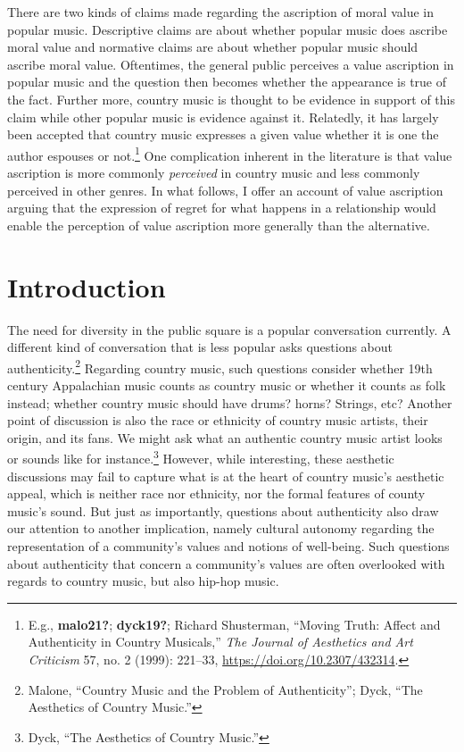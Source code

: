 \documentclass[
  12pt,
]{book}
\theoremstyle{definition}
\theoremstyle{definition}
\theoremstyle{definition}
\theoremstyle{definition}
\theoremstyle{remark}
\begin{document}
There are two kinds of claims made regarding the ascription of moral value in popular music. Descriptive claims are about whether popular music does ascribe moral value and normative claims are about whether popular music should ascribe moral value. Oftentimes, the general public perceives a value ascription in popular music and the question then becomes whether the appearance is true of the fact. Further more, country music is thought to be evidence in support of this claim while other popular music is evidence against it. Relatedly, it has largely been accepted that country music expresses a given value whether it is one the author espouses or not.\footnote{E.g., \textbf{malo21?}; \textbf{dyck19?}; Richard Shusterman, {``Moving {Truth}: {Affect} and {Authenticity} in {Country Musicals},''} \emph{The Journal of Aesthetics and Art Criticism} 57, no. 2 (1999): 221--33, \url{https://doi.org/10.2307/432314}.} One complication inherent in the literature is that value ascription is more commonly \emph{perceived} in country music and less commonly perceived in other genres. In what follows, I offer an account of value ascription arguing that the expression of regret for what happens in a relationship would enable the perception of value ascription more generally than the alternative.

\section{Introduction}\label{introduction}

The need for diversity in the public square is a popular conversation currently. A different kind of conversation that is less popular asks questions about authenticity.\footnote{Malone, {``Country {Music} and the {Problem} of {Authenticity}''}; Dyck, {``The Aesthetics of Country Music.''}} Regarding country music, such questions consider whether 19th century Appalachian music counts as country music or whether it counts as folk instead; whether country music should have drums? horns? Strings, etc? Another point of discussion is also the race or ethnicity of country music artists, their origin, and its fans. We might ask what an authentic country music artist looks or sounds like for instance.\footnote{Dyck, {``The Aesthetics of Country Music.''}} However, while interesting, these aesthetic discussions may fail to capture what is at the heart of country music's aesthetic appeal, which is neither race nor ethnicity, nor the formal features of county music's sound. But just as importantly, questions about authenticity also draw our attention to another implication, namely cultural autonomy regarding the representation of a community's values and notions of well-being. Such questions about authenticity that concern a community's values are often overlooked with regards to country music, but also hip-hop music.
\end{document}
